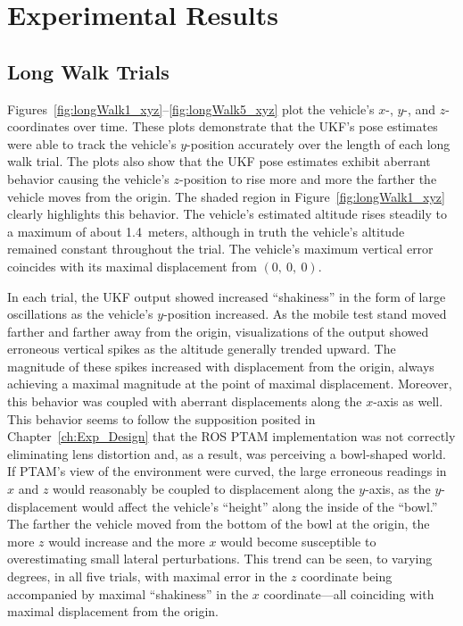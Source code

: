 \chapter{Experimental Results} \label{ch:Exp_Results}

\section{Long Walk Trials} \label{sec:long_walk}

Figures~\ref{fig:longWalk1_xyz}--\ref{fig:longWalk5_xyz} plot the vehicle's $x$-, $y$-, and $z$-coordinates over time. These plots demonstrate that the UKF's pose estimates were able to track the vehicle's $y$-position accurately over the length of each long walk trial. The plots also show that the UKF pose estimates exhibit aberrant behavior causing the vehicle's $z$-position to rise more and more the farther the vehicle moves from the origin. The shaded region in Figure~\ref{fig:longWalk1_xyz} clearly highlights this behavior. The vehicle's estimated altitude rises steadily to a maximum of about 1.4~meters, although in truth the vehicle's altitude remained constant throughout the trial. The vehicle's maximum vertical error coincides with its maximal displacement from $\left( 0,\ 0,\ 0 \right)$.

In each trial, the UKF output showed increased ``shakiness'' in the form of large oscillations as the vehicle's $y$-position increased. As the mobile test stand moved farther and farther away from the origin, visualizations of the output showed erroneous vertical spikes as the altitude generally trended upward. The magnitude of these spikes increased with displacement from the origin, always achieving a maximal magnitude at the point of maximal displacement. Moreover, this behavior was coupled with aberrant displacements along the $x$-axis as well. This behavior seems to follow the supposition posited in Chapter~\ref{ch:Exp_Design} that the ROS PTAM implementation was not correctly eliminating lens distortion and, as a result, was perceiving a bowl-shaped world. If PTAM's view of the environment were curved, the large erroneous readings in $x$ and $z$ would reasonably be coupled to displacement along the $y$-axis, as the $y$-displacement would affect the vehicle's ``height'' along the inside of the ``bowl.'' The farther the vehicle moved from the bottom of the bowl at the origin, the more $z$ would increase and the more $x$ would become susceptible to overestimating small lateral perturbations. This trend can be seen, to varying degrees, in all five trials, with maximal error in the $z$ coordinate being accompanied by maximal ``shakiness'' in the $x$ coordinate---all coinciding with maximal displacement from the origin.

